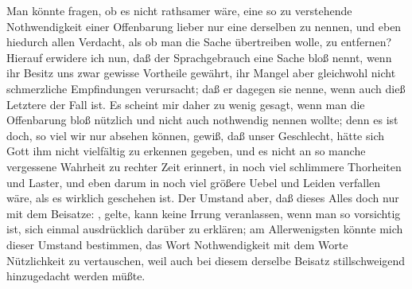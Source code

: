 \begin{aufza}
\begin{aufzb}
\begin{RWanm}
Man könnte fragen, ob es nicht rathsamer wäre, eine so zu verstehende Nothwendigkeit einer Offenbarung lieber nur eine  derselben zu nennen, und eben hiedurch allen Verdacht, als ob man die Sache übertreiben wolle, zu entfernen? Hierauf erwidere ich nun, daß der Sprachgebrauch eine Sache bloß  nennt, wenn ihr Besitz uns zwar gewisse Vortheile gewährt, ihr Mangel aber gleichwohl nicht schmerzliche Empfindungen verursacht; daß er dagegen sie  nenne, wenn auch dieß Letztere der Fall ist. Es scheint mir daher zu wenig gesagt, wenn man die Offenbarung bloß nützlich und nicht auch nothwendig nennen wollte; denn es ist doch, so viel wir nur absehen können, gewiß, daß unser Geschlecht, hätte sich Gott ihm nicht vielfältig zu erkennen gegeben, und es nicht an so manche vergessene Wahrheit zu rechter Zeit erinnert, in noch viel schlimmere Thorheiten und Laster, und eben darum in noch viel größere Uebel und Leiden verfallen wäre, als es wirklich geschehen ist. Der Umstand aber, daß dieses Alles doch nur mit dem Beisatze: , gelte, kann keine Irrung veranlassen, wenn man so vorsichtig ist, sich einmal ausdrücklich darüber zu erklären; am Allerwenigsten könnte mich dieser Umstand bestimmen, das Wort Nothwendigkeit mit dem Worte Nützlichkeit zu vertauschen, weil auch bei diesem derselbe Beisatz stillschweigend hinzugedacht werden müßte.~
\end{RWanm} 
\end{aufzb}
\end{aufza}

